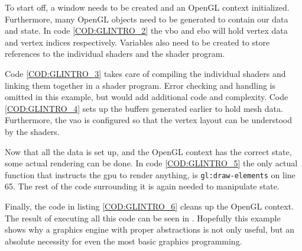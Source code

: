 
To start off,
a window needs to be created and an OpenGL context initialized.
Furthermore,
many OpenGL objects need to be generated to contain our data and state.
In code \ref{COD:GLINTRO_2} the \ac{vbo} and \ac{ebo} will hold vertex data and vertex indices respectively.
Variables also need to be created to store references to the individual shaders and the shader program.


Code \ref{COD:GLINTRO_3} takes care of compiling the individual shaders and linking them together in a shader program.
Error checking and handling is omitted in this example,
but would add additional code and complexity. Code \ref{COD:GLINTRO_4} sets up the buffers generated earlier to hold mesh data.
Furthermore,
the \ac{vao} is configured so that the vertex layout can be understood by the shaders.



Now that all the data is set up,
and the OpenGL context has the correct state,
some actual rendering can be done.
In code \ref{COD:GLINTRO_5} the only actual function that instructs the \ac{gpu} to render anything,
is \texttt{gl:draw-elements} on line 65.
The rest of the code surrounding it is again needed to manipulate state.

Finally, the code in listing \ref{COD:GLINTRO_6} cleans up the OpenGL context.
The result of executing all this code can be seen in .
Hopefully this example shows why a graphics engine with proper abstractions is not only useful,
but an absolute necessity for even the most basic graphics programming.


